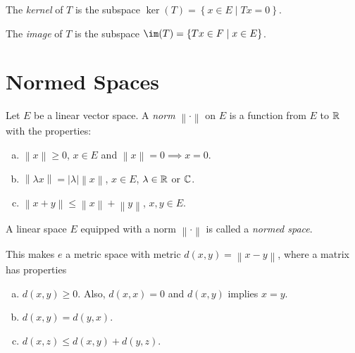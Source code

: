 \begin{definition}[Kernel]
	The \emph{kernel} of \(T\) is the subspace \(\ker(T) = \left\{ x\in E\mid Tx=0 \right\} \).
\end{definition}

\begin{definition}[Image]
	The \emph{image} of \(T\) is the subspace \(\im(T) = \left\{ Tx\in F\mid x\in E \right\} \).
\end{definition}

\section{Normed Spaces}

\begin{definition}[Norm]
	Let \(E\) be a linear vector space. A \emph{norm} \(\left\lVert \cdot \right\rVert \) on \(E\) is a function from \(E\) to \(\mathbb{\MakeUppercase{r}} \) with the properties:
	\begin{enumerate}[(a)]
		\item \(\left\lVert x\right\rVert \geq 0\), \(x\in E\) and \(\left\lVert x\right\rVert =0 \implies x=0\).
		\item \(\left\lVert \lambda x\right\rVert = \left\vert \lambda  \right\vert \left\lVert x\right\rVert\), \(x\in E\), \(\lambda \in\mathbb{\MakeUppercase{r}} \) or \(\mathbb{\MakeUppercase{c}} \).
		\item \(\left\lVert x+y\right\rVert \leq \left\lVert x\right\rVert + \left\lVert y\right\rVert \), \(x, y\in E\).
	\end{enumerate}
\end{definition}

\begin{definition}
	A linear space \(E\) equipped with a norm \(\left\lVert \cdot\right\rVert \) is called a \emph{normed space}.
\end{definition}

\begin{remark}
	This makes \(e\) a metric space with metric \(d(x, y) = \left\lVert x- y\right\rVert \), where a matrix has properties
	\begin{enumerate}[(a)]
		\item \(d(x, y) \geq 0\). Also, \(d(x, x) = 0\) and \(d(x, y)\) implies \(x =y\).
		\item \(d(x, y) = d(y, x)\).
		\item \(d(x, z) \leq d(x, y) + d(y, z)\).
	\end{enumerate}
\end{remark}

